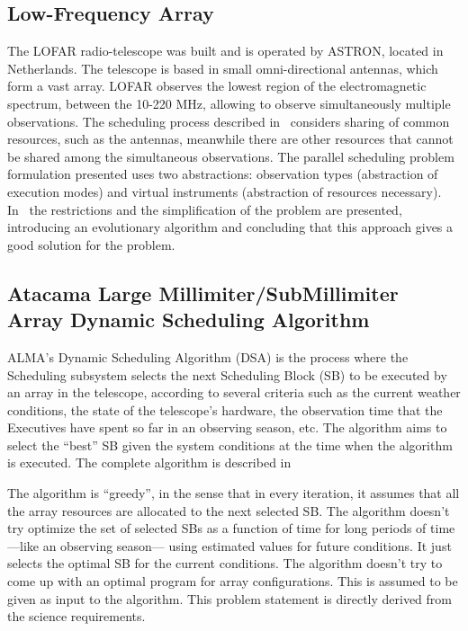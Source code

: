 \subsection{Low-Frequency Array}
The LOFAR radio-telescope was built and is operated by ASTRON, located in Netherlands. The telescope is based in small omni-directional antennas, which form a vast array. LOFAR observes the lowest region of the electromagnetic spectrum, between the 10-220 MHz, allowing to observe simultaneously multiple observations. The scheduling process described in~\cite{RJBHW2002} considers sharing of common resources, such as the antennas, meanwhile there are other resources that cannot be shared among the simultaneous observations.  The parallel scheduling problem formulation presented uses two abstractions: observation types (abstraction of execution modes) and virtual instruments (abstraction of resources necessary). In~\cite{RJBHW2002} the restrictions and the simplification of the problem are presented, introducing an evolutionary algorithm and concluding that this approach gives a good solution for the problem.

\subsection{Atacama Large Millimiter/SubMillimiter Array Dynamic Scheduling Algorithm}
\label{sec:alma-dsa}

ALMA's Dynamic Scheduling Algorithm (DSA) is the process where the Scheduling subsystem selects the next Scheduling Block (SB) to be executed by an array in the telescope, according to several criteria such as the current weather conditions, the state of the telescope's hardware, the observation time that the Executives have spent so far in an observing season, etc. The algorithm aims to select the ``best'' SB given the system conditions at the time when the algorithm is executed. The complete algorithm is described in \cite{avarias11} 

The algorithm is ``greedy'', in the sense that in every iteration, it assumes that all the array resources are allocated to the next selected SB. The algorithm doesn't try optimize the set of selected SBs as a function of time for long periods of time ---like an observing season--- using estimated values for future conditions. It just selects the optimal SB for the current conditions. The algorithm doesn't try to come up with an optimal program for array configurations. This is assumed to be given as input to the algorithm. This problem statement is directly derived from the science requirements.

